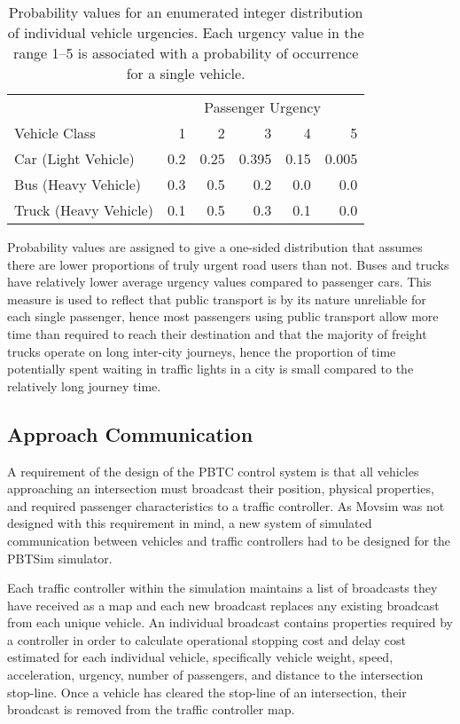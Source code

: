 \begin{table}[]
\begin{center}
\begin{tabular}{lrrrrr}
\toprule
 & \multicolumn{5}{c}{Passenger Urgency} \\
 \cmidrule(lr){2-6}
Vehicle Class & 1 & 2 & 3 & 4 & 5 \\
\midrule
Car (Light Vehicle) & 0.2 & 0.25 & 0.395 & 0.15 & 0.005  \\
Bus (Heavy Vehicle) & 0.3 & 0.5 & 0.2 & 0.0 & 0.0 \\
Truck (Heavy Vehicle) & 0.1 & 0.5 & 0.3 & 0.1 & 0.0 \\
\bottomrule
\end{tabular}
\end{center}
\caption{Probability values for an enumerated integer distribution of individual vehicle urgencies. Each urgency value in the range 1--5 is associated with a probability of occurrence for a single vehicle. }
	\label{urgencydistribution}
\end{table}

Probability values are assigned to give a one-sided distribution that assumes there are lower proportions of truly urgent road users than not. Buses and trucks have relatively lower average urgency values compared to passenger cars. This measure is used to reflect that public transport is by its nature unreliable for each single passenger, hence most passengers using public transport allow more time than required to reach their destination and that the majority of freight trucks operate on long inter-city journeys, hence the proportion of time potentially spent waiting in traffic lights in a city is small compared to the relatively long journey time.

\subsection{Approach Communication}

A requirement of the design of the PBTC control system is that all vehicles approaching an intersection must broadcast their position, physical properties, and required passenger characteristics to a traffic controller. As Movsim was not designed with this requirement in mind, a new system of simulated communication between vehicles and traffic controllers had to be designed for the PBTSim simulator.

Each traffic controller within the simulation maintains a list of broadcasts they have received as a map and each new broadcast replaces any existing broadcast from each unique vehicle. An individual broadcast contains properties required by a controller in order to calculate operational stopping cost and delay cost estimated for each individual vehicle, specifically vehicle weight, speed, acceleration, urgency, number of passengers, and distance to the intersection stop-line. Once a vehicle has cleared the stop-line of an intersection, their broadcast is removed from the traffic controller map.

